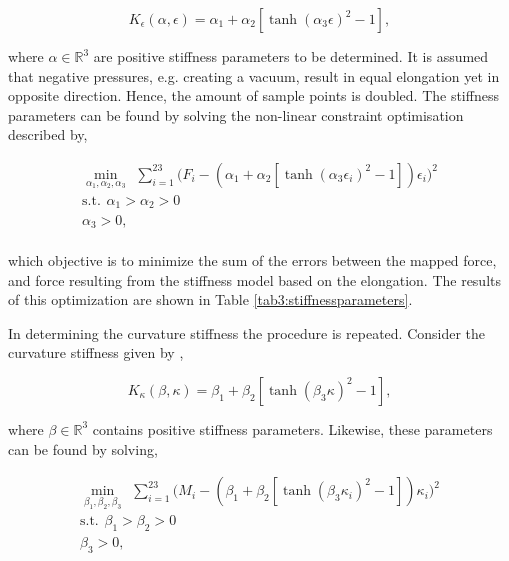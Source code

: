 \begin{equation}
    K_\epsilon(\alpha,\epsilon) =  \alpha_1 + \alpha_2 [\tanh({\alpha_3 \epsilon})^2 -1],
\end{equation}


where $\alpha \in \mathbb{R}^3$ are positive stiffness parameters to be determined. It is assumed that negative pressures, e.g. creating a vacuum, result in equal elongation yet in opposite direction. Hence, the amount of sample points is doubled. The stiffness parameters can be found by solving the non-linear constraint optimisation described by,


\begin{equation}
\begin{aligned}
\min_{\alpha_1,\alpha_2,\alpha_3} \hspace{5pt} \sum_{i=1}^{23}\Big(F_i -  (\alpha_1 + \alpha_2 [\tanh({\alpha_3 \epsilon_i})^2 -1])\epsilon_i\Big)^2    \\ 
\text{s.t.} \hspace{5pt} \alpha_1 > \alpha_2 > 0 \\
\alpha_3 > 0, \\ 
\label{eq3:Keopt}
\end{aligned}
\end{equation}

which objective is to minimize the sum of the errors between the mapped force, and force resulting from the stiffness model based on the elongation. The results of this optimization are shown in Table \ref{tab3:stiffnessparameters}.

In determining the curvature stiffness the procedure is repeated.  Consider the curvature stiffness given by \cite{Caasenbrood2020StiffnessModel},

\begin{equation}
    K_\kappa(\beta,\kappa) =  \beta_1 + \beta_2 [\tanh({\beta_3 \kappa})^2 -1],
\end{equation}

where $\beta \in \mathbb{R}^3$ contains positive stiffness parameters. Likewise, these parameters can be found by solving,

\begin{equation}
\begin{aligned}
\min_{\beta_1,\beta_2,\beta_3} \hspace{5pt} \sum_{i=1}^{23}\big(M_i -  (\beta_1 + \beta_2 [\tanh({\beta_3 {\kappa_i}})^2 -1]){\kappa_i}\Big)^2    \\ 
\text{s.t.} \hspace{5pt} \beta_1 > \beta_2 > 0 \\
\beta_3 > 0, \\ 
\label{eq3:Kkopt}
\end{aligned}
\end{equation}

